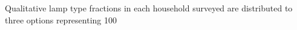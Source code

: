 Qualitative lamp type fractions in each household surveyed are distributed to three options representing 100%
